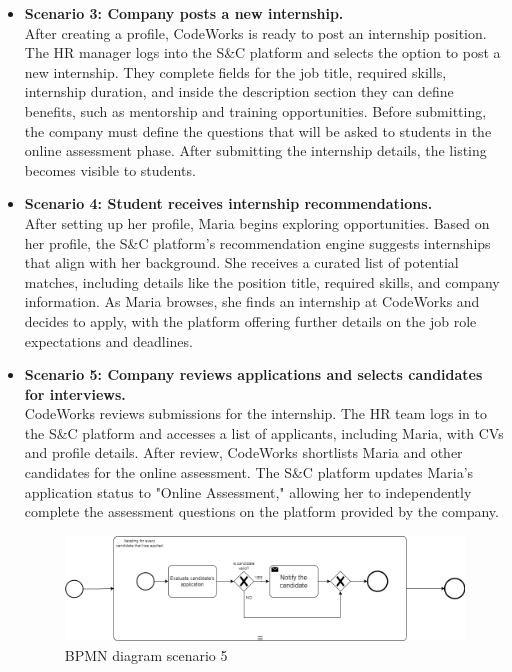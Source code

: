 \begin{itemize}
    \item \textbf{Scenario 3: Company posts a new internship.} \\
    After creating a profile, CodeWorks is ready to post an internship position. The HR manager logs into the S\&C platform and selects the option to post a new internship. They complete fields for the job title, required skills, internship duration, and inside the description section they can define benefits, such as mentorship and training opportunities. Before submitting, the company must define the questions that will be asked to students in the online assessment phase. After submitting the internship details, the listing becomes visible to students.

    \item \textbf{Scenario 4: Student receives internship recommendations.}  \\
    After setting up her profile, Maria begins exploring opportunities. Based on her profile, the S\&C platform’s recommendation engine suggests internships that align with her background. She receives a curated list of potential matches, including details like the position title, required skills, and company information. As Maria browses, she finds an internship at CodeWorks and decides to apply, with the platform offering further details on the job role expectations and deadlines.

    \item \textbf{Scenario 5: Company reviews applications and selects candidates for interviews.} \\
    CodeWorks reviews submissions for the internship. The HR team logs in to the S\&C platform and accesses a list of applicants, including Maria, with CVs and profile details. After review, CodeWorks shortlists Maria and other candidates for the online assessment. The S\&C platform updates Maria's application status to "Online Assessment," allowing her to independently complete the assessment questions on the platform provided by the company.

    \begin{figure}[!ht]
    \centering
    \includegraphics[scale=0.30]{Images/ImagesRASD/scenario_5.png}
    \caption{BPMN diagram scenario 5}
    \end{figure}


\end{itemize}
